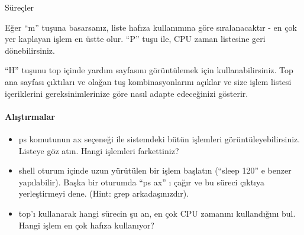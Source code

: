 \begin{section}{Süreçler}
\begin{itemize}
Eğer “m” tuşuna basarsanız, liste hafıza kullanımına göre sıralanacaktır - en çok yer kaplayan işlem en üstte olur. “P” tuşu ile, CPU zaman listesine geri dönebilirsiniz.

“H” tuşunu  top içinde yardım sayfasını görüntülemek için kullanabilirsiniz. Top ana sayfası çıktıları ve olağan tuş kombinasyonlarını açıklar ve size işlem listesi içeriklerini gereksinimlerinize göre nasıl adapte edeceğinizi gösterir.
\end{itemize}
\paragraph{Alıştırmalar}{
\begin{itemize}
 \item ps komutunun ax seçeneği ile sistemdeki bütün işlemleri görüntüleyebilirsiniz. Listeye göz atın. Hangi işlemleri farkettiniz?
 \item shell oturum içinde uzun yürütülen bir işlem başlatın (“sleep 120” e benzer yapılabilir). Başka bir oturumda  “ps ax” ı çağır ve bu süreci çıktıya 
yerleştirmeyi dene. (Hint: grep arkadaşınızdır).
\item top'ı kullanarak hangi sürecin şu an, en çok CPU zamanını kullandığını bul. Hangi işlem en çok hafıza kullanıyor?
\end{itemize}}
\end{section}
